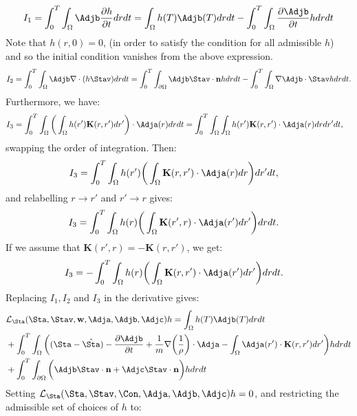 \begin{align*}
I_1 = \int_0^T \int_\Omega \Adjb\frac{\partial h}{\partial t} dr dt = \int_\Omega h(T) \Adjb(T) dr dt - \int_0^T \int_\Omega  \frac{\partial \Adjb}{\partial t}h dr dt
\end{align*}
Note that ${h}(r,0)=0$, (in order to satisfy the condition for all admissible ${h}$) and so the initial condition vanishes from the above expression.
\begin{align*}
I_2= \int_0^T \int_\Omega \Adjb\nabla \cdot (h \Stav) dr dt = \int_0^T \int_{\partial \Omega} \Adjb \Stav \cdot \mathbf{n} h dr dt - \int_0^T \int_\Omega \nabla \Adjb \cdot \Stav h dr dt.
\end{align*}
Furthermore, we have:
\begin{align*}
I_{3}&= \int_0^T \int_\Omega \bigg(\int_\Omega  h(r') \mathbf{K}(r,r')dr'\bigg) \cdot \Adja(r) drdt=\int_0^T \int_\Omega \int_\Omega h(r') \mathbf{K}(r,r') \cdot \Adja(r) drdr'dt,
\end{align*}
swapping the order of integration. Then:
\begin{align*}
I_{3}&= \int_0^T \int_\Omega  h(r')\bigg(\int_\Omega  \mathbf{K}(r,r')\cdot \Adja(r) dr \bigg)dr'dt,
\end{align*}
and relabelling $r \to r'$ and $r' \to r$ gives:
\begin{align*}
I_{3}&= \int_0^T \int_\Omega  h(r)\bigg(\int_\Omega  \mathbf{K}(r',r) \cdot \Adja(r') dr' \bigg)drdt.
\end{align*}
If we assume that $\mathbf{K}(r',r) = - \mathbf{K}(r,r')$, we get:
\begin{align*}
I_{3}&= -\int_0^T \int_\Omega  h(r)\bigg(\int_\Omega  \mathbf{K}(r,r') \cdot \Adja(r') dr' \bigg)drdt.
\end{align*}
Replacing $I_1, I_2$ and $I_3$ in the derivative gives:
\begin{align*}
&\mathcal{L}_\Sta(\Sta,\Stav,\mathbf{w},\Adja,\Adjb,\Adjc)h = \int_\Omega h(T) \Adjb(T) dr dt  \\
&+ \int_0^T \int_\Omega \bigg( (\Sta - \hat \Sta) - \frac{\partial \Adjb}{\partial t} +\frac{1}{m}\nabla \bigg(\frac{1}{\rho}\bigg)\cdot \Adja -  \int_\Omega  \Adja(r') \cdot\mathbf{K}(r,r')   dr'  \bigg)hdr dt\\
&+\int_0^T \int_{\partial \Omega} \bigg(  \Adjb \Stav \cdot \mathbf{n}   +\Adjc \Stav \cdot \mathbf{n}\bigg)h  dr dt
\end{align*}
Setting $\mathcal{L}_\Sta(\Sta,\Stav,\Con,\Adja,\Adjb,\Adjc)h=0$, and restricting the admissible set of choices of $h$ to:
